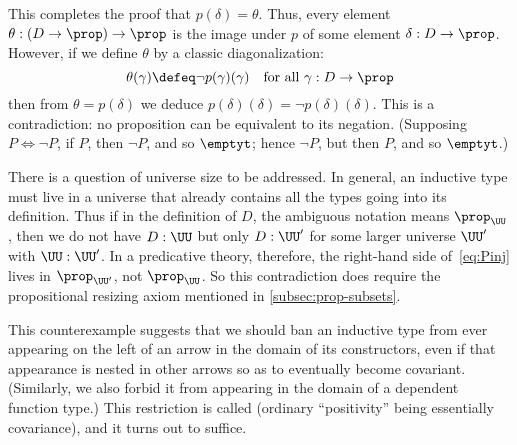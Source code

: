 This completes the proof that $p(\delta)=\theta$.
Thus, every element $\theta:(D\to\prop)\to\prop$ is the image under $p$ of some element $\delta:D\to\prop$.
However, if we define $\theta$ by a classic diagonalization:
\[ \theta(\gamma) \defeq \neg p(\gamma)(\gamma) \quad\text{for all $\gamma:D\to\prop$} \]
then from $\theta = p(\delta)$ we deduce $p(\delta)(\delta) = \neg p(\delta)(\delta)$.
This is a contradiction: no proposition can be equivalent to its negation.
(Supposing $P\Leftrightarrow \neg P$, if $P$, then $\neg P$, and so $\emptyt$; hence $\neg P$, but then $P$, and so $\emptyt$.)

\begin{rmk}
  There is a question of universe size to be addressed.
  In general, an inductive type must live in a universe that already contains all the types going into its definition.
  Thus if in the definition of $D$, the ambiguous notation \prop means $\prop_{\UU}$, then we do not have $D:\UU$ but only $D:\UU'$ for some larger universe $\UU'$ with $\UU:\UU'$.
  In a predicative theory, therefore, the right-hand side of~\eqref{eq:Pinj} lives in $\prop_{\UU'}$, not $\prop_\UU$.
  So this contradiction does require the propositional resizing axiom
  mentioned in \cref{subsec:prop-subsets}.
\end{rmk}

%
This counterexample suggests that we should ban an inductive type from ever appearing on the left of an arrow in the domain of its constructors, even if that appearance is nested in other arrows so as to eventually become covariant.
(Similarly, we also forbid it from appearing in the domain of a dependent function type.)
This restriction is called 
%
%
(ordinary ``positivity'' being essentially covariance), and it turns out to suffice.


